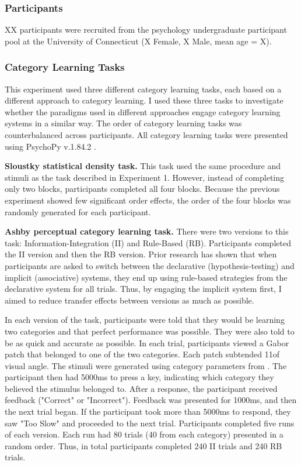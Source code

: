 \documentclass[../dissertation.tex]{subfiles}
\begin{document}
\subsubsection{Participants}
XX participants were recruited from the psychology undergraduate participant pool at the University of Connecticut (X Female, X Male, mean age = X).
\subsubsection{Category Learning Tasks}
This experiment used three different category learning tasks, each based on a different approach to category learning. I used these three tasks to investigate whether the paradigms used in different approaches engage category learning systems in a similar way. The order of category learning tasks was counterbalanced across participants. All category learning tasks were presented using PsychoPy v.1.84.2 \citep{Peirce2007}. \par 
\textbf{Sloustky statistical density task.} This task used the same procedure and stimuli as the task described in Experiment 1. However, instead of completing only two blocks, participants completed all four blocks. Because the previous experiment showed few significant order effects, the order of the four blocks was randomly generated for each participant. \par
\textbf{Ashby perceptual category learning task.} There were two versions to this task: Information-Integration (II) and Rule-Based (RB). Participants completed the II version and then the RB version. Prior research has shown that when participants are asked to switch between the declarative (hypothesis-testing) and implicit (associative) systems, they end up using rule-based strategies from the declarative system for all trials. Thus, by engaging the implicit system first, I aimed to reduce transfer effects between versions as much as possible. \par
In each version of the task, participants were told that they would be learning two categories and that perfect performance was possible. They were also told to be as quick and accurate as possible. In each trial, participants viewed a Gabor patch that belonged to one of the two categories. Each patch subtended 11\degree  of visual angle. The stimuli were generated using category parameters from \citet{Maddox2003}. The participant then had 5000ms to press a key, indicating which category they believed the stimulus belonged to. After a response, the participant received feedback ("Correct" or "Incorrect"). Feedback was presented for 1000ms, and then the next trial began. If the participant took more than 5000ms to respond, they saw "Too Slow" and proceeded to the next trial. Participants completed five runs of each version. Each run had 80 trials (40 from each category) presented in a random order. Thus, in total participants completed 240 II trials and 240 RB trials. \par
\end{document}

